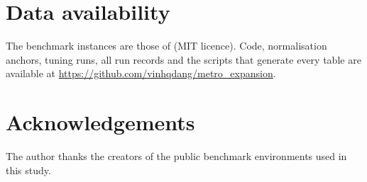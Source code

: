 \documentclass[preprint,12pt,authoryear]{elsarticle}
\begin{document}
\section*{Data availability}
The benchmark instances are those of \citet{michailidis2026} (MIT licence). Code, normalisation anchors, tuning runs, all run records and the scripts that generate every table are available at \url{https://github.com/vinhqdang/metro_expansion}.

\section*{Acknowledgements}
The author thanks the creators of the public benchmark environments used in this study.




\appendix

\end{document}
